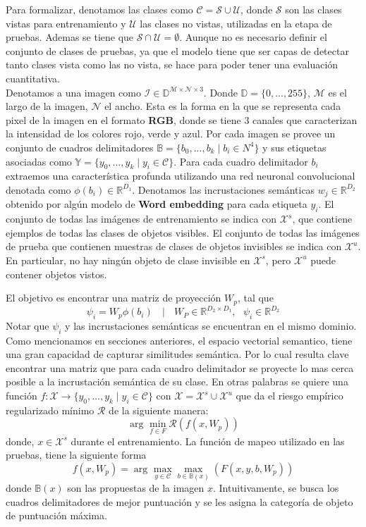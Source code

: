 Para formalizar, denotamos las clases como $\mathcal{C} = \mathcal{S} \cup \mathcal{U}$, donde $\mathcal{S}$ son las clases vistas para entrenamiento y $\mathcal{U}$ las clases no vistas, utilizadas en la etapa de pruebas. Ademas se tiene que $\mathcal{S} \cap \mathcal{U} = \emptyset$. Aunque no es necesario definir el conjunto de clases de pruebas, ya que el modelo tiene que ser capas de detectar tanto clases vista como las no vista, se hace para poder tener una evaluación cuantitativa.\\
Denotamos a una imagen como $\mathcal{I} \in \mathbb{D}^{\mathcal{M} \times \mathcal{N} \times 3}$. Donde $\mathbb{D} = \{0,...,255\}$, $\mathcal{M}$  es el largo de la imagen, $\mathcal{N}$ el ancho. Esta es la forma en la que se representa cada pixel de la imagen en el formato \textbf{RGB}, donde se tiene 3 canales que caracterizan la intensidad de los colores rojo, verde y azul. Por cada imagen se provee un conjunto de cuadros delimitadores  $\mathbb{B} = \{b_0,...,b_k\mid b_i \in N^4\}$ y sus etiquetas asociadas como $\mathbb{Y} = \{y_0,...,y_k\mid y_i \in \mathcal{C}\}$. Para cada cuadro delimitador $b_i$ extraemos una característica profunda utilizando una red neuronal convolucional denotada como $\phi(b_i) \in \mathbb{R}^{D_1}$. Denotamos las incrustaciones semánticas $w_j \in  \mathbb{R}^{D_2}$ obtenido por algún modelo de \textbf{Word embedding} para cada etiqueta $y_i$. El conjunto de todas las imágenes de entrenamiento se indica con $\mathcal{X}^s$, que contiene ejemplos de todas las clases de objetos visibles.  El conjunto de todas las imágenes de prueba que contienen muestras de clases de objetos invisibles se indica con  $\mathcal{X}^u$. En particular, no hay ningún objeto de clase invisible en $\mathcal{X}^s$, pero $\mathcal{X}^u$ puede contener objetos vistos.

El objetivo es encontrar una matriz de proyección $W_p$, tal que \[ \psi_i = W_p\phi(b_i) \:\:\:\mid\:\:\: W_P \in \mathbb{R}^{D_2 \times D_1},\:\:\: \psi_i \in \mathbb{R}^{D_2} \] Notar que $\psi_i$ y las incrustaciones semánticas se encuentran en el mismo dominio. Como mencionamos en secciones anteriores, el espacio vectorial semantico, tiene una gran capacidad de capturar similitudes semántica. Por lo cual resulta clave encontrar una matriz que para cada cuadro delimitador se proyecte lo mas cerca posible a la incrustación semántica de su clase. En otras palabras se quiere una función $f : \mathcal{X} \to \{y_0,...,y_k\mid y_i \in \mathcal{C}\}$ con $\mathcal{X} =  \mathcal{X}^s \cup \mathcal{X}^u$ que da el riesgo empírico regularizado mínimo $\mathcal{R}$ de la siguiente manera: \[ \arg_{}\min_{f \in F} \mathcal{R}(f(x,W_p)) \] donde, $x \in \mathcal{X}^s$ durante el entrenamiento. La función de mapeo utilizado en las pruebas, tiene la siguiente forma \[ f(x,W_p) = \arg_{}\max_{y \in \mathcal{C}}\max_{b \in \mathbb{B}(x)} (F(x,y,b,W_p))\] donde $\mathbb{B}(x)$ son las propuestas de la imagen $x$. Intuitivamente, se busca los cuadros delimitadores de mejor puntuación y se les asigna la categoría de objeto de puntuación máxima.\\


